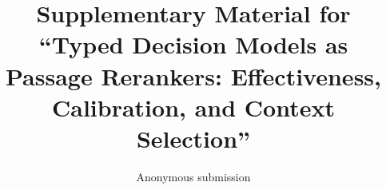 \documentclass[Afour,sagev,times]{sagej}
\begin{document}
\title{Supplementary Material for ``Typed Decision Models as Passage Rerankers: Effectiveness, Calibration, and Context Selection''}

\author{Anonymous submission}

\maketitle





\end{document}
